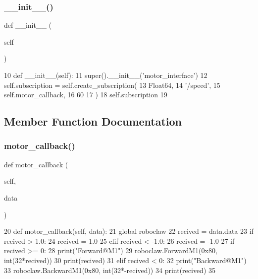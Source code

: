 \subsubsection{\texorpdfstring{\+\_\+\+\_\+init\+\_\+\+\_\+()}{\_\_init\_\_()}}
{\footnotesize\ttfamily def \+\_\+\+\_\+init\+\_\+\+\_\+ (\begin{DoxyParamCaption}\item[{}]{self }\end{DoxyParamCaption})}


\begin{DoxyCode}
10     \textcolor{keyword}{def }\_\_init\_\_(self):
11         super().\_\_init\_\_(\textcolor{stringliteral}{'motor\_interface'})
12         self.subscription = self.create\_subscription(
13                 Float64,
14                 \textcolor{stringliteral}{'/speed'},
15                 self.motor\_callback,
16                 60
17                 )
18         self.subscription
19 
\end{DoxyCode}


\subsection{Member Function Documentation}
\mbox{\label{classtoxic__hardware_1_1motor__interface_1_1MotorInterface_a9e946487184abfcf65c5372008f4e868}} 
\subsubsection{\texorpdfstring{motor\+\_\+callback()}{motor\_callback()}}
{\footnotesize\ttfamily def motor\+\_\+callback (\begin{DoxyParamCaption}\item[{}]{self,  }\item[{}]{data }\end{DoxyParamCaption})}


\begin{DoxyCode}
20     \textcolor{keyword}{def }motor\_callback(self, data):
21         \textcolor{keyword}{global} roboclaw
22         recived = data.data
23         \textcolor{keywordflow}{if} recived > 1.0:
24             recived = 1.0
25         \textcolor{keywordflow}{elif} recived < -1.0:
26             recived = -1.0
27         \textcolor{keywordflow}{if} recived >= 0:
28             print(\textcolor{stringliteral}{"Forward@M1"})
29             roboclaw.ForwardM1(0x80, int(32*recived))
30             print(recived)
31         \textcolor{keywordflow}{elif} recived < 0:
32             print(\textcolor{stringliteral}{"Backward@M1"})
33             roboclaw.BackwardM1(0x80, int(32*-recived))
34             print(recived)
35 
\end{DoxyCode}


